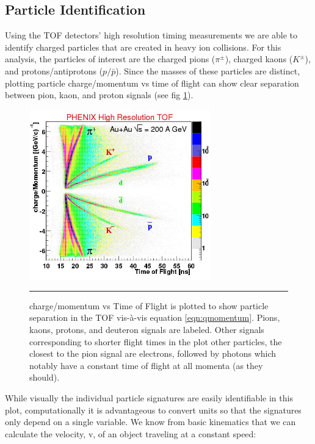 \subsection{Particle Identification}
\label{sect:pidmethod}
Using the TOF detectors' high resolution timing measurements we are able to identify charged particles that are created in heavy ion collisions. For this analysis, the particles of interest are the charged pions ($\pi^{\pm}$), charged kaons ($K^{\pm}$), and protons/antiprotons ($p/\bar{p}$). Since the masses of these particles are distinct, plotting particle charge/momentum vs time of flight can show clear separation between pion, kaon, and proton signals (see fig \ref{fig:tofchargemom}). 

\begin{figure}[htbp!]
  \centering
    \includegraphics[width=0.7\textwidth]{Figures/tofchargemom.JPG}
    \rule{35em}{0.5pt}
  \caption[Particle separation in the TOF]{charge/momentum vs Time of Flight\citep{tofchargemom} is plotted to show particle separation in the TOF vis-\`a-vis equation \ref{eqn:qmomentum}. Pions, kaons, protons, and deuteron signals are labeled. Other signals corresponding to shorter flight times in the plot other particles, the closest to the pion signal are electrons, followed by photons which notably have a constant time of flight at all momenta (as they should).}
  \label{fig:tofchargemom}
\end{figure}

While visually the individual particle signatures are easily identifiable in this plot, computationally it is advantageous to convert units so that the signatures only depend on a single variable. We know from basic kinematics that we can calculate the velocity, v, of an object traveling at a constant speed:


